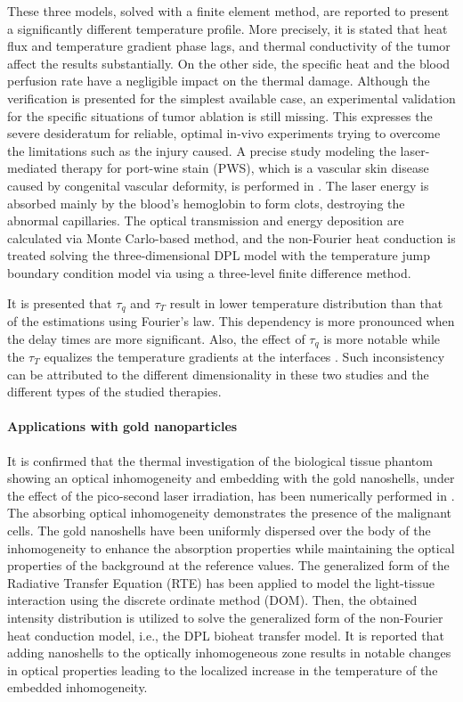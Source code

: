 \documentclass[sn-mathphys]{sn-jnl}%
\theoremstyle{thmstyleone}%
\theoremstyle{thmstyletwo}%
\theoremstyle{thmstylethree}%
\begin{document}
{These three models, solved with a finite element method, are reported to present a significantly different temperature profile. More precisely, it is stated that heat flux and temperature gradient phase lags, and thermal conductivity of the tumor affect the results substantially. On the other side, the specific heat and the blood perfusion rate have a negligible impact on the thermal damage. Although the verification is presented for the simplest available case, an experimental validation for the specific situations of tumor ablation is still missing. This expresses the severe desideratum for reliable, optimal in-vivo experiments trying to overcome the limitations such as the injury caused. A precise study modeling the laser-mediated therapy for port-wine stain (PWS), which is a vascular skin disease caused by congenital vascular deformity, is performed in \cite{Zhang2017}. The laser energy is absorbed mainly by the blood's hemoglobin to form clots, destroying the abnormal capillaries. The optical transmission and energy deposition are calculated via Monte Carlo-based method, and the non-Fourier heat conduction is treated solving the three-dimensional DPL model with the temperature jump boundary condition \cite{Ghazanfarian2009,Shomali2012} model via using a three-level finite difference method.

It is presented that $\tau_q$ and $\tau_T$ result in lower temperature distribution than that of the estimations using Fourier's law. This dependency is more pronounced when the delay times are more significant. Also, the effect of $\tau_q$ is more notable while the $\tau_T$ equalizes the temperature gradients at the interfaces \cite{Kumar2016ll}. Such inconsistency can be attributed to the different dimensionality in these two studies and the different types of the studied therapies.

\paragraph{Applications with gold nanoparticles}
It is confirmed that the thermal investigation of the biological tissue phantom showing an optical inhomogeneity and embedding with the gold nanoshells, under the effect of the pico-second laser irradiation, has been numerically performed in \cite{Phadnis2016}. The absorbing optical inhomogeneity demonstrates the presence of the malignant cells. The gold nanoshells have been uniformly dispersed over the body of the inhomogeneity to enhance the absorption properties while maintaining the optical properties of the background at the reference values. The generalized form of the Radiative Transfer Equation (RTE) has been applied to model the light-tissue interaction using the discrete ordinate method (DOM). Then, the obtained intensity distribution is utilized to solve the generalized form of the non-Fourier heat conduction model, i.e., the DPL bioheat transfer model. It is reported that adding nanoshells to the optically inhomogeneous zone results in notable changes in optical properties leading to the localized increase in the temperature of the embedded inhomogeneity.

}
\end{document}
